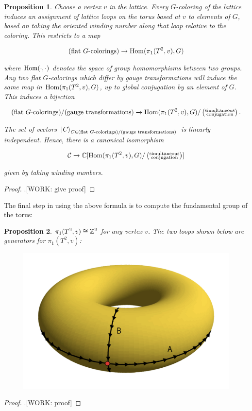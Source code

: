 \documentclass{article}
\newtheorem{proposition}{Proposition}[section]
\theoremstyle{definition}
\numberwithin{figure}{section}
\begin{document}
\begin{proposition} Choose a vertex $v$ in the lattice. Every $G$-coloring of the lattice induces an assignment of lattice loops on the torus based at $v$ to elements of $G$, based on taking the oriented winding number along that loop relative to the coloring. This restricts to a map

$$(\text{flat $G$-colorings})\xrightarrow{}\mathrm{Hom}(\pi_1(T^2,v), G)$$

where $\mathrm{Hom}(\cdot,\cdot)$ denotes the space of group homomorphisms between two groups. Any two flat $G$-colorings which differ by gauge transformations will induce the same map in $\mathrm{Hom}(\pi_1(T^2,v), G)$, up to global conjugation by an element of $G$. This induces a bijection

$$(\text{flat $G$-colorings})/(\text{gauge transformations})\xrightarrow{}\mathrm{Hom}(\pi_1(T^2,v), G)/\left(\substack{\text{simultaneous} \\ \text{conjugation}}\right).$$

The set of vectors ${\ket{C}}_{C\in (\text{flat $G$-colorings})/(\text{gauge transformations})}$ is linearly independent. Hence, there is a canonical isomorphism

$$\mathcal{C} \xrightarrow{}\mathbb{C}[\mathrm{Hom}(\pi_1(T^2,v), G)/\left(\substack{\text{simultaneous} \\ \text{conjugation}}\right)]$$

given by taking winding numbers.
\end{proposition}
\begin{proof}.[WORK: give proof]
\end{proof}

The final step in using the above formula is to compute the fundamental group of the torus:

\begin{proposition} $\pi_1(T^2,v)\cong \mathbb{Z}^2$ for any vertex $v$. The two loops shown below are generators for $\pi_1(T^2,v)$:

\begin{figure}[h]
\begin{center}
\includegraphics[scale=.3]{torus}
\end{center}
\end{figure}

\end{proposition}
\begin{proof}.[WORK: proof]
\end{proof}
\end{document}
